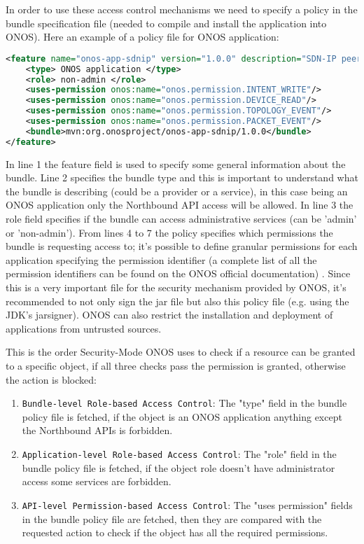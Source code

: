 \documentclass[a4paper,10pt]{memoir}
\begin{document}
In order to use these access control mechanisms we need to specify a policy in the bundle specification file (needed to compile and install the application into ONOS). Here an example of a policy file for ONOS application:
\begin{lstlisting}[language=XML]
<feature name="onos-app-sdnip" version="1.0.0" description="SDN-IP peering application">
	<type> ONOS application </type>
	<role> non-admin </role>
	<uses-permission onos:name="onos.permission.INTENT_WRITE"/>
	<uses-permission onos:name="onos.permission.DEVICE_READ"/>
	<uses-permission onos:name="onos.permission.TOPOLOGY_EVENT"/>
	<uses-permission onos:name="onos.permission.PACKET_EVENT"/>
	<bundle>mvn:org.onosproject/onos-app-sdnip/1.0.0</bundle>
</feature>
\end{lstlisting}
In line 1 the feature field is used to specify some general information about the bundle. Line 2 specifies the bundle type and this is important to understand what the bundle is describing (could be a provider or a service), in this case being an ONOS application only the Northbound API access will be allowed. In line 3 the role field specifies if the bundle can access administrative services (can be 'admin' or 'non-admin'). From lines 4 to 7 the policy specifies which permissions the bundle is requesting access to; it's possible to define granular permissions for each application specifying the permission identifier (a complete list of all the permission identifiers can be found on the ONOS official documentation) \cite{secmode-perms}. Since this is a very important file for the security mechanism provided by ONOS, it's recommended to not only sign the jar file but also this policy file (e.g. using the JDK’s jarsigner). ONOS can also restrict the installation and deployment of applications from untrusted sources.

This is the order Security-Mode ONOS uses to check if a resource can be granted to a specific object, if all three checks pass the permission is granted, otherwise the action is blocked:
\begin{enumerate}
  \item\texttt{Bundle-level Role-based Access Control}: The "type" field in the bundle policy file is fetched, if the object is an ONOS application anything except the Northbound APIs is forbidden.
  \item\texttt{Application-level Role-based Access Control}: The "role" field in the bundle policy file is fetched, if the object role doesn't have administrator access some services are forbidden. 
  \item\texttt{API-level Permission-based Access Control}: The "uses permission" fields in the bundle policy file are fetched, then they are compared with the requested action to check if the object has all the required permissions. 
\end{enumerate}
\end{document}
